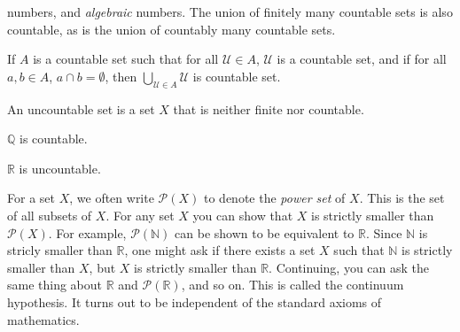 \documentclass[crop=false,class=book,oneside]{standalone}
\begin{document}
            numbers, and \textit{algebraic} numbers. The
            union of finitely many countable sets is also
            countable, as is the union of countably many
            countable sets.
            \begin{theorem}
                If $A$ is a countable set such that for all
                $\mathcal{U}\in{A}$, $\mathcal{U}$ is a
                countable set, and if for all $a,b\in{A}$,
                $a\cap{b}=\emptyset$, then
                $\bigcup_{\mathcal{U}\in{A}}\mathcal{U}$
                is countable set.
            \end{theorem}
            \begin{definition}
                An uncountable set is a set $X$ that is neither
                finite nor countable.
            \end{definition}
            \begin{theorem}
                $\mathbb{Q}$ is countable.
            \end{theorem}
            \begin{theorem}
                $\mathbb{R}$ is uncountable.
            \end{theorem}
            For a set $X$, we often write
            $\mathcal{P}(X)$ to denote the
            \textit{power set} of $X$. This is the
            set of all subsets of $X$.
            For any set $X$ you can show that $X$ is
            strictly smaller than $\mathcal{P}(X)$.
            For example, $\mathcal{P}(\mathbb{N})$
            can be shown to be equivalent to $\mathbb{R}$.
            Since $\mathbb{N}$ is stricly smaller than
            $\mathbb{R}$, one might ask if there exists
            a set $X$ such that $\mathbb{N}$ is strictly
            smaller than $X$, but $X$ is strictly smaller
            than $\mathbb{R}$. Continuing, you can ask the
            same thing about $\mathbb{R}$ and
            $\mathcal{P}(\mathbb{R})$, and so on.
            This is called the continuum hypothesis.
            It turns out to be independent of
            the standard axioms of mathematics.
\end{document}
